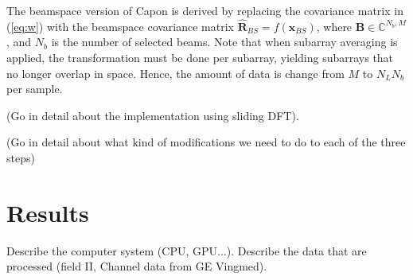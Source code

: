 \documentclass[journal]{IEEEtran}
\newcommand{\mat}[1]{\mathbf{#1}}
\renewcommand{\vec}[1]{\mathbf{#1}}
\begin{document}
The beamspace version of Capon is derived by replacing the covariance matrix in (\ref{eq:w}) with the beamspace covariance matrix $\mat{\hat{R}}_{BS} = f(\vec{x}_{BS})$, where $\mat{B} \in \mathbb{C}^{N_b,M}$, and $N_b$ is the number of selected beams. Note that when subarray averaging is applied, the transformation must be done per subarray, yielding subarrays that no longer overlap in space. Hence, the amount of data is change from $M$ to $N_LN_b$ per sample.

(Go in detail about the implementation using sliding DFT).

(Go in detail about what kind of modifications we need to do to each of the three steps)


\section{Results}\label{sec:res}
Describe the computer system (CPU, GPU...). Describe the data that are processed (field II, Channel data from GE Vingmed).
\end{document}
